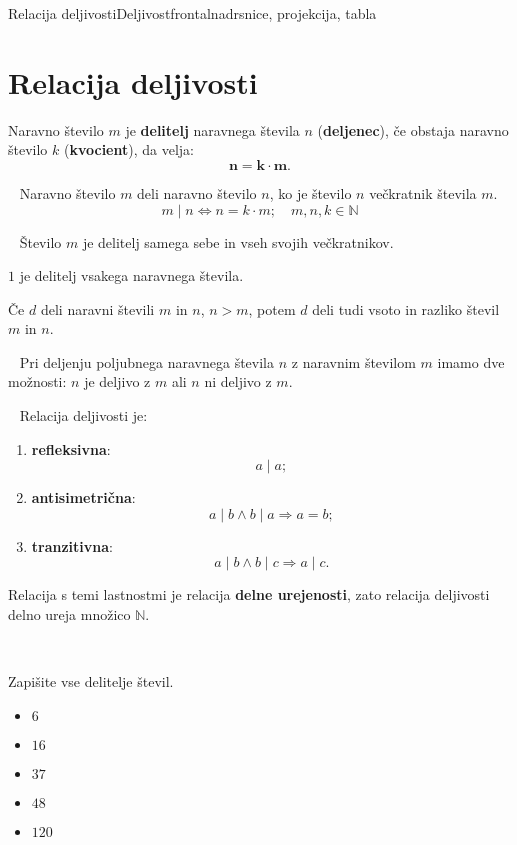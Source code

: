 \begin{priprava}{1}{}{Relacija deljivosti}{Deljivost}{frontalna}{drsnice, projekcija, tabla}


    \section{Relacija deljivosti}
            
    Naravno število $m$ je \textbf{delitelj} naravnega števila $n$ (\textbf{deljenec}), če obstaja naravno število $k$ (\textbf{kvocient}), da velja: $$\mathbf{n=k\cdot m}.$$

    ~\newline
    Naravno število $m$ deli naravno število $n$, ko je število $n$ večkratnik števila $m$. $$m\mid n \Leftrightarrow n=k\cdot m;\quad m,n,k\in\mathbb{N}$$

    ~\newline
    Število $m$ je delitelj samega sebe in vseh svojih večkratnikov.

    $1$ je delitelj vsakega naravnega števila.
    ~\newline

    Če $d$ deli naravni števili $m$ in $n$, $n>m$, potem $d$ deli tudi vsoto in razliko števil $m$ in $n$.

    ~\newline
    Pri deljenju poljubnega naravnega števila $n$ z naravnim številom $m$ imamo dve možnosti: $n$ je deljivo z $m$ ali $n$ ni deljivo z $m$.

    ~\newline
    Relacija deljivosti je:
    \begin{enumerate}
        \item \textbf{refleksivna}: $$a\mid a;$$
        \item \textbf{antisimetrična}: $$a\mid b \wedge b\mid a \Rightarrow a=b;$$
        \item \textbf{tranzitivna}:  $$a\mid b \wedge b\mid c \Rightarrow a\mid c.$$
    \end{enumerate}

    Relacija s temi lastnostmi je relacija \textbf{delne urejenosti}, zato relacija deljivosti delno ureja množico $\mathbb{N}$.

    ~\newline~

    \begin{multicols}{2}
        
    \begin{naloga}
        Zapišite vse delitelje števil.
        \begin{itemize}
            \item $6$ 
            \item $16$ 
            \item $37$ 
            \item $48$ 
            \item $120$ 
        \end{itemize}
    \end{naloga}        



\end{multicols}
\end{priprava}

